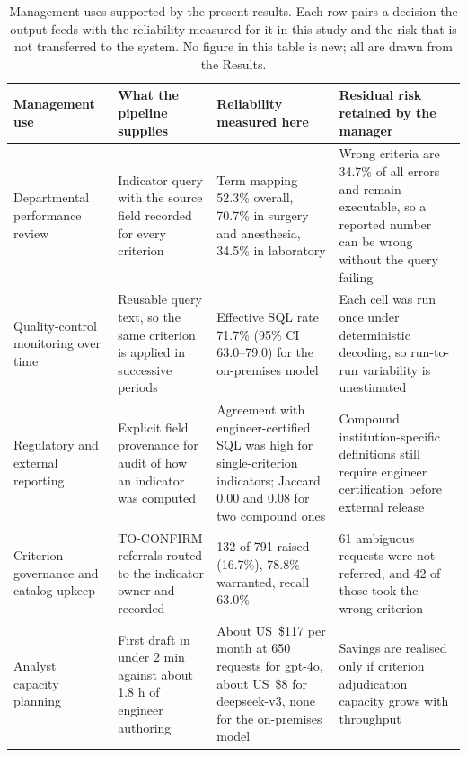 \documentclass[applsci,article,submit,pdftex,oneauthor]{Definitions/mdpi}
\begin{document}
\begin{table}[H]
\caption{Management uses supported by the present results. Each row pairs a
decision the output feeds with the reliability measured for it in this study and
the risk that is not transferred to the system. No figure in this table is new;
all are drawn from the Results.}
\label{tab:mgmt}
\centering
\footnotesize
\setlength{\tabcolsep}{4pt}
\begin{tabular}{L{2.4cm}L{3.3cm}L{3.3cm}L{3.3cm}}
\toprule
Management use & What the pipeline supplies & Reliability measured here &
Residual risk retained by the manager\\
\midrule
Departmental performance review &
Indicator query with the source field recorded for every criterion &
Term mapping 52.3\% overall, 70.7\% in surgery and anesthesia, 34.5\% in
laboratory &
Wrong criteria are 34.7\% of all errors and remain executable, so a reported
number can be wrong without the query failing\\
\addlinespace
Quality-control monitoring over time &
Reusable query text, so the same criterion is applied in successive periods &
Effective SQL rate 71.7\% (95\% CI 63.0--79.0) for the on-premises model &
Each cell was run once under deterministic decoding, so run-to-run variability is
unestimated\\
\addlinespace
Regulatory and external reporting &
Explicit field provenance for audit of how an indicator was computed &
Agreement with engineer-certified SQL was high for single-criterion indicators;
Jaccard 0.00 and 0.08 for two compound ones &
Compound institution-specific definitions still require engineer certification
before external release\\
\addlinespace
Criterion governance and catalog upkeep &
TO-CONFIRM referrals routed to the indicator owner and recorded &
132 of 791 raised (16.7\%), 78.8\% warranted, recall 63.0\% &
61 ambiguous requests were not referred, and 42 of those took the wrong
criterion\\
\addlinespace
Analyst capacity planning &
First draft in under 2 min against about 1.8 h of engineer authoring &
About US~\$117 per month at 650 requests for gpt-4o, about US~\$8 for
deepseek-v3, none for the on-premises model &
Savings are realised only if criterion adjudication capacity grows with
throughput\\
\bottomrule
\end{tabular}
\end{table}
\end{document}
